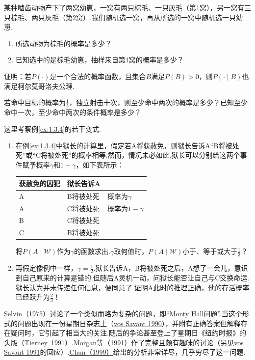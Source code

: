 \begin{exercise}\label{exercise:1.34}
某种啮齿动物产下了两窝幼崽，一窝有两只棕毛、一只灰毛（第1窝），另一窝有三只棕毛、两只灰毛（第2窝）.我们随机选一窝，再从所选的一窝中随机选一只幼崽.
\begin{enumerate}
\item[(a)] 所选动物为棕毛的概率是多少？
\item[(b)] 已知选中的是棕毛幼崽，抽样来自第1窝的概率是多少？
\end{enumerate}
\end{exercise}

\begin{exercise}\label{exercise:1.35}
证明：若$P(\cdot)$是一个合法的概率函数，且集合$B$满足$P(B)>0$，则$P(\cdot\mid B)$也满足柯尔莫哥洛夫公理.
\end{exercise}

\begin{exercise}\label{exercise:1.36}
若命中目标的概率为$\frac15$，独立射击十次，则至少命中两次的概率是多少？已知至少命中一次，至少命中两次的条件概率是多少？
\end{exercise}



\begin{exercise}\label{exercise:1.37}
这里考察例\ref{ex:1.3.4}的若干变式.
\begin{enumerate}
\item[(a)] 在例\ref{ex:1.3.4}中狱长的计算里，假定若A将获赦免，则狱长告诉A“B将被处死”或“C将被处死”的概率相等.然而，情况未必如此.狱长可以分别给这两个事件赋予概率$\gamma$和$1-\gamma$，如下表所示：
\begin{center}
\begin{tabular}{lll}
\hline
获赦免的囚犯 & 狱长告诉A & \\
\hline
A & B将被处死 & 概率为$\gamma$\\
A & C将被处死 & 概率为$1-\gamma$\\
B & C将被处死 & \\
C & B将被处死 & \\
\hline
\end{tabular}
\end{center}
将$P(A\mid\mathscr{W})$作为$\gamma$的函数求出.$\gamma$取何值时，$P(A\mid\mathscr{W})$小于、等于或大于$\frac13$？
\item[(b)] 再假定像例中一样，$\gamma=\frac12$.狱长告诉A，B将被处死之后，A想了一会儿，意识到自己原来的计算是错的.但随后A灵机一动，问狱长能否让自己与C交换命运.狱长认为并未传递任何信息，便同意了.证明A此时的推理正确，他的存活概率已经跃升为$\frac23$！
\end{enumerate}
\hyperref[bib:source285]{Selvin（1975）}讨论了一个类似而略为复杂的问题，即“Monty Hall问题”.当这个形式的问题出现在一份星期日杂志上（\hyperref[bib:source322]{vos Savant 1990}），并附有正确答案但解释存在疑问时，它引起了相当大的关注.随后的争论甚至登上了星期日《纽约时报》的头版\mbox{（\hyperref[bib:source314]{Tierney 1991}）.}\hyperref[bib:source223]{Morgan等（1991）}作了完整且颇有趣味的讨论（另见\hyperref[bib:source323]{vos Savant 1991}\mbox{的回应）.}\hyperref[bib:source77]{Chun（1999）}给出的分析非常详尽，几乎穷尽了这一问题.
\end{exercise}

